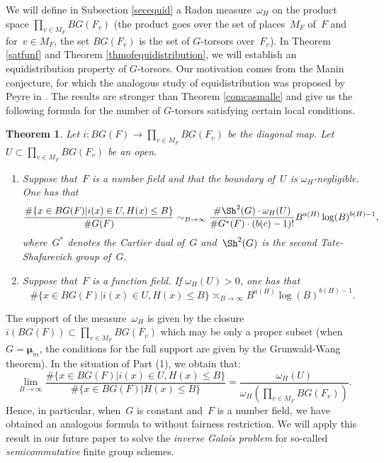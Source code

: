 \documentclass[a4paper,english,12pt]{amsart}
\newcommand{\vMF}{v\in M_F}
\newcommand{\muu}{\boldsymbol{\mu}}
\newtheorem{thm}[equation]{Theorem}
\numberwithin{equation}{subsection}
\begin{document}
We will define in Subsection \ref{secequid} a Radon measure~$\omega_H$ on the product space $\prod_{\vMF} BG(F_v)$ (the product goes over the set of places~$M_F$ of~$F$ and for~$v\in M_F$, the set $BG(F_v)$ is the set of $G$-torsors over~$F_v$). In Theorem \ref{satfunf} and Theorem \ref{thmofequidistribution}, we will establish an equidistribution property of $G$-torsors. Our motivation comes from the Manin conjecture, for which the analogous study of equidistribution was proposed by Peyre in \cite{Peyre}. The results are stronger than Theorem \ref{comcasmalle} and give us the following formula for the number of $G$-torsors satisfying certain local conditions.
\begin{thm}\label{equintro} Let $i:BG(F)\to\prod_{\vMF}BG(F_v)$ be the diagonal map. Let~$U\subset \prod_{\vMF}BG(F_v)$ be an open.
\begin{enumerate}  
\item Suppose that~$F$ is a number field and that the boundary of~$U$ is $\omega_H$-negligible. One has that \begin{equation*}\frac{\#\{x\in BG(F)|i(x)\in U, H(x)\leq B\}}{\# G(F)}\sim_{B\to\infty}\frac{\#\Sh^2(G)\cdot\omega_H(U)}{\# G^*(F)\cdot (b(c)-1)!}B^{a(H)}\log(B)^{b(H)-1},
\end{equation*}
where~$G^*$ denotes the Cartier dual of~$G$ and~$\Sh^2(G)$ is the second Tate-Shafarevich group of~$G$. 
\item Suppose that~$F$ is a function field. If $\omega_H(U)>0$, one has that $$\#\{x\in BG(F)|i(x)\in U, H(x)\leq B\}\asymp_{B\to\infty} B^{a(H)}\log(B)^{b(H)-1}.$$
\end{enumerate}
\end{thm}
The support of the measure~$\omega_H$ is given by the closure $\overline{i(BG(F))}\subset\prod_{\vMF}BG(F_v)$ which may be only a proper subset (when $G=\muu_m$, the conditions for the full support are given by the Grunwald-Wang theorem). In the situation of Part (1), we obtain that:
$$\lim_{B\to\infty}\frac{\#\{x\in BG(F)|i(x)\in U, H(x)\leq B\}}{\#\{x\in BG(F)|H(x)\leq B\}}=\frac{\omega_H(U)}{\omega_H(\prod_{\vMF}BG(F_v))}.$$
Hence, in particular, when~$G$ is constant and~$F$ is a number field, we have obtained an analogous formula to \cite[Theorem 2.1]{onprobabilitieslocal} without fairness restriction.  We will apply this result in our future paper \cite{dardayasudasemicomm} to solve the {\it inverse Galois problem} for so-called {\it semicommutative} finite group schemes.
\end{document}
